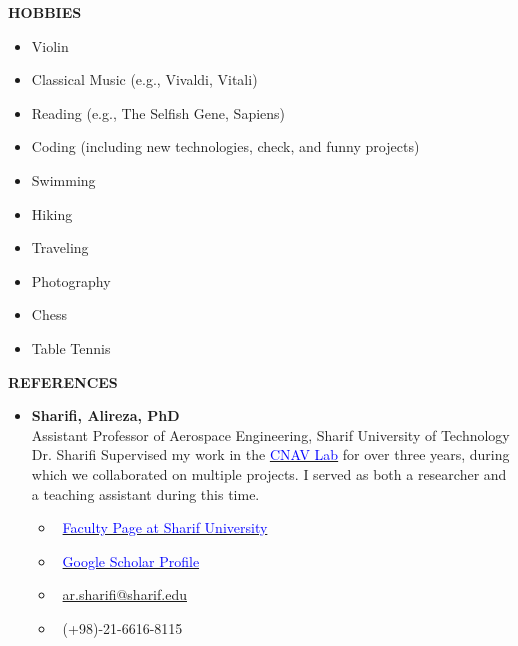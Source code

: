 \documentclass[12pt]{article}
\begin{document}
\begin{center}
	{\noindent \bfseries HOBBIES}
\end{center}
\begin{itemize}
    \item Violin \faMusic
    \item Classical Music (e.g., Vivaldi, Vitali) \faHeadphones
    \item Reading (e.g., The Selfish Gene, Sapiens) \faBook
    \item Coding (including new technologies, check, and funny projects) \faLaptopCode
\end{itemize}
\begin{multicols}{3}
	\begin{itemize}
    \item Swimming \faSwimmer
    \item Hiking \faMountain
    \item Traveling \faPlane
    \item Photography \faCamera
    \item Chess \faChess
    \item Table Tennis \faTableTennis
\end{itemize}
\end{multicols}



\vspace{0.2in} %



\begin{center}
	{\noindent \bfseries REFERENCES}
\end{center}
\begin{itemize}
	\item \textbf{Sharifi, Alireza, PhD} \\
	Assistant Professor of Aerospace Engineering, Sharif University of Technology \\
Dr. Sharifi Supervised my work in the \href{https://www.linkedin.com/company/cnav-lab/}{\textcolor{blue}{CNAV Lab}} for over three years, during which we collaborated on multiple projects.
I served as both a researcher and a teaching assistant during this time.
	\begin{multicols}{2}
		\begin{itemize}
			\item \faGlobe \ \href{https://ae.sharif.edu/~portal/faculty/1730782165}{\textcolor{blue}{Faculty Page at Sharif University}}
			\item \faGraduationCap \ \href{https://scholar.google.com/citations?user=k_OdlNMAAAAJ&hl=en}{\textcolor{blue}{Google Scholar Profile}}
			\item \faEnvelope \ \href{mailto:ar.sharifi@sharif.edu}{ar.sharifi@sharif.edu}
			\item \faPhone \ (+98)-21-6616-8115
		\end{itemize}
\end{multicols}
\end{itemize}
\end{document}

